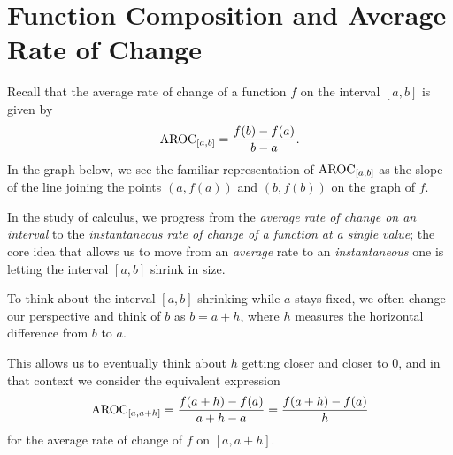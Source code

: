 \documentclass{ximera}
\begin{document}

\section{Function Composition and Average Rate of Change}

Recall that the average rate of change of a function $f$ on the interval $[a,b]$ is given by%
\begin{equation*}
\mathrm{AROC}_{[a,b]} = \frac{f(b) - f(a)}{b-a}\text{.}
\end{equation*}
In the graph below, we see the familiar representation of $\mathrm{AROC}_{[a,b]}$ as the slope of the line joining the points $(a,f(a))$ and $(b,f(b))$ on the graph of $f$. 


 In the study of calculus, we progress from the \emph{average rate of change on an interval} to the \emph{instantaneous rate of change of a function at a single value}; the core idea that allows us to move from an \emph{average} rate to an \emph{instantaneous} one is letting the interval $[a,b]$ shrink in size.

To think about the interval $[a,b]$ shrinking while $a$ stays fixed, we often change our perspective and think of $b$ as $b = a + h$, where $h$ measures the horizontal difference from $b$ to $a$.  


This allows us to eventually think about $h$ getting closer and closer to $0$, and in that context we consider the equivalent expression%
\begin{equation*}
\mathrm{AROC}_{[a,a+h]} = \frac{f(a+h) - f(a)}{a+h-a} = \frac{f(a+h) - f(a)}{h} 
\end{equation*}
for the average rate of change of $f$ on	$[a,a+h]$.%
\end{document}
